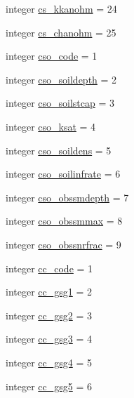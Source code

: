 \begin{DoxyCompactItemize}
\item 
integer \hyperlink{namespacecolnamesinputfiles_a03022e15ff7b5ee61681506cf7c51a2d}{cs\+\_\+kkanohm} = 24
\item 
integer \hyperlink{namespacecolnamesinputfiles_a002123e1a4d6e3102987980f56dacdd9}{cs\+\_\+chanohm} = 25
\item 
integer \hyperlink{namespacecolnamesinputfiles_a750911cb1a69d2d28f3b97ca1e8d40af}{cso\+\_\+code} = 1
\item 
integer \hyperlink{namespacecolnamesinputfiles_a8f92572bd1ed479f68b9c79308114583}{cso\+\_\+soildepth} = 2
\item 
integer \hyperlink{namespacecolnamesinputfiles_a762c09efd81c2a0789867996f250d528}{cso\+\_\+soilstcap} = 3
\item 
integer \hyperlink{namespacecolnamesinputfiles_abc296ff8b879ee72ed27a26ba0e2a402}{cso\+\_\+ksat} = 4
\item 
integer \hyperlink{namespacecolnamesinputfiles_aabee2fa19a7eb7a83e16ea233911bad0}{cso\+\_\+soildens} = 5
\item 
integer \hyperlink{namespacecolnamesinputfiles_a2223751db40afad6708ef049a89a74d0}{cso\+\_\+soilinfrate} = 6
\item 
integer \hyperlink{namespacecolnamesinputfiles_a5f5d0391da71a109ac38812b9cfcb09c}{cso\+\_\+obssmdepth} = 7
\item 
integer \hyperlink{namespacecolnamesinputfiles_a99244bb6c133e30d823031ec8c1f7067}{cso\+\_\+obssmmax} = 8
\item 
integer \hyperlink{namespacecolnamesinputfiles_ad5679a32c978e147737a5d21fa736281}{cso\+\_\+obssnrfrac} = 9
\item 
integer \hyperlink{namespacecolnamesinputfiles_a365c5f4e9d5796fd3c43ffc1886ecf74}{cc\+\_\+code} = 1
\item 
integer \hyperlink{namespacecolnamesinputfiles_a90e929109e7a8cd08df95f99f2561cd1}{cc\+\_\+gsg1} = 2
\item 
integer \hyperlink{namespacecolnamesinputfiles_a614110f82a823e6142965db6efb55168}{cc\+\_\+gsg2} = 3
\item 
integer \hyperlink{namespacecolnamesinputfiles_a1a8c73a721f0366e832c7786efdc3941}{cc\+\_\+gsg3} = 4
\item 
integer \hyperlink{namespacecolnamesinputfiles_ab4b1e0fe0864334d7bcb1e4b07c3107f}{cc\+\_\+gsg4} = 5
\item 
integer \hyperlink{namespacecolnamesinputfiles_a71e9d63ba438f0913267aae404e38818}{cc\+\_\+gsg5} = 6
\item 

\end{DoxyCompactItemize}
